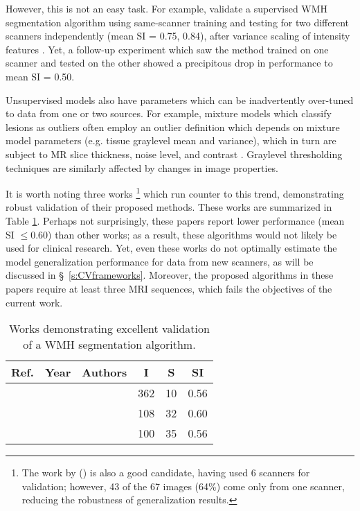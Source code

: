 However, this is not an easy task.
For example, \citeauthor{Steenwijk2013} validate a supervised WMH segmentation algorithm using same-scanner training and testing for two different scanners independently (mean SI = 0.75, 0.84), after variance scaling of intensity features \cite{Steenwijk2013}.
Yet, a follow-up experiment which saw the method trained on one scanner and tested on the other showed a precipitous drop in performance to mean SI = 0.50.
\par
Unsupervised models also have parameters which can be inadvertently over-tuned to data from one or two sources.
For example, mixture models which classify lesions as outliers often employ an outlier definition which depends on mixture model parameters (e.g. tissue graylevel mean and variance), which in turn are subject to MR slice thickness, noise level, and contrast \cite{VanLeemput2001,Souplet2008,Garcia-Lorenzo2011,Roura2015}.
Graylevel thresholding techniques \cite{Jack2001,Smart2011,Samaille2012,Schmidt2012,Khademi2014} are similarly affected by changes in image properties.
\par
It is worth noting three works%
\footnote{The work by \citeauthor{Samaille2012} (\citeyear{Samaille2012}) \cite{Samaille2012} is also a good candidate, having used 6 scanners for validation; however, 43 of the 67 images (64\%) come only from one scanner, reducing the robustness of generalization results.}
which run counter to this trend, demonstrating robust validation of their proposed methods.
These works are summarized in Table \ref{tab:priorworkval}.
Perhaps not surprisingly, these papers report lower performance (mean SI $\le 0.60$) than other works; as a result, these algorithms would not likely be used for clinical research.
Yet, even these works do not optimally estimate the model generalization performance for data from new scanners, as will be discussed in \S\ \ref{s:CVframeworks}.
Moreover, the proposed algorithms in these papers require at least three MRI sequences, which fails the objectives of the current work.
\begin{table}[h]
  \newcommand{\citefortablev}[1]{{\cite{#1}}&{\citeyear{#1}}&{\citeauthor{#1}}}
  \caption{Works demonstrating excellent validation of a WMH segmentation algorithm.}\label{tab:priorworkval}
  \centering
    \begin{tabular}{cclccc}
      \hline
      Ref.&Year&Authors&I&S&SI
      \\\hline
      \citefortablev{Dyrby2008} & 362 & 10 & 0.56 \\
      \citefortablev{Guizard2015} & 108 & 32 & 0.60 \\
      \citefortablev{Harmouche2015} & 100 & 35 & 0.56 \\
      \hline
    \end{tabular}
\end{table}
